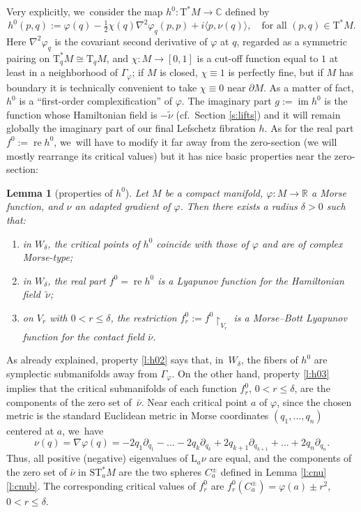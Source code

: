 \documentclass[10pt]{amsart}
\newcommand{\C}{{\mathbb C}}
\newcommand{\R}{{\mathbb R}}
\newcommand{\Crit}{\Gamma_{\!\varphi}}
\newcommand{\re}{\operatorname{re}}
\newcommand{\im}{\operatorname{im}}
\newcommand{\etc}{,\ldots,}
\newcommand{\tu}[1]{\textup{#1}}
\newcommand{\sT}{\mathrm{T}^\ast}
\newcommand{\sST}{\mathrm{ST}^\ast}
\newcommand{\rT}{\mathrm{T}}
\newcommand{\hnu}{\tilde\nu}
\newcommand{\cnu}{\bar\nu}
\def\Lnu_#1{{\mathrm L_#1\nu}}
\newcommand{\prg}[1]{\langle #1 \rangle}
\newcommand{\de}{\mathrel{:=}}
\newcommand{\rst}[1]{{\upharpoonright}_{\!#1}}
\let\del\partial
\let\on\colon
\theoremstyle{plain}
\newtheorem{lemma}[theorem]{Lemma}
\theoremstyle{definition}
\begin{document}
Very explicitly, we~consider the map $h^0 \on \sT M \to \C$ defined by
\[
h^0(p,q) \de \varphi(q) - \tfrac12 \chi(q) \nabla^2\varphi_q (p,p)
	+ i \prg{p, \nu(q)}, \quad \text{for all $(p,q) \in \sT M$.}
\]
Here $\nabla^2\varphi_q$ is the covariant second derivative of $\varphi$ at $q$,
regarded as a symmetric pairing on $\sT_qM \cong \rT_qM$, and $\chi \on M \to
[0,1]$ is a cut-off function equal to $1$ at least in a neighborhood of $\Crit$;
if $M$ is closed, $\chi \equiv 1$ is perfectly fine, but if $M$ has boundary it
is technically convenient to take $\chi \equiv 0$ near $\del M$. As a matter of
fact, $h^0$ is a ``first-order complexification'' of $\varphi$. The imaginary
part $g \de \im h^0$ is the function whose Hamiltonian field is $-\hnu$ (cf.\
Section \ref{s:lifts}) and it will remain globally the imaginary part of our
final Lefschetz fibration $h$. As for the real part $f^0 \de \re h^0$, we~will
have to modify it far away from the zero-section (we will mostly rearrange its
critical values) but it has nice basic properties near the zero-section:

\begin{lemma}[properties of $h^0$] \label{l:h0}
Let $M$ be a compact manifold, $\varphi \on M \to \R$ a Morse function, and
$\nu$ an adapted gradient of $\varphi$. Then there exists a radius $\delta>0$
such that\tu:
\begin{enumerate}
\item\label{l:h01}
in $W_\delta$, the critical points of $h^0$ coincide with those of $\varphi$ and
are of complex Morse-type\tu;
\item\label{l:h02}
in $W_\delta$, the real part $f^0 = \re h^0$ is a Lyapunov function for the
Hamiltonian field~$\hnu$\tu;
\item\label{l:h03}
on $V_r$ with $0 < r \le \delta$, the restriction $f_r^0 \de f^0 \rst{ V_r }$ is
a Morse--Bott Lyapunov function for the contact field $\cnu$.
\end{enumerate}
\end{lemma}

As already explained, property \eqref{l:h02} says that, in~$W_\delta$, the fibers of $h^0$
are symplectic submanifolds away from $\Crit$. On the other hand, property \eqref{l:h03}
implies that the critical submanifolds of each function $f_r^0$, $0 < r \le
\delta$, are the components of the zero set of~$\cnu$. Near each critical point
$a$ of $\varphi$, since the chosen metric is the standard Euclidean metric in
Morse coordinates $(q_1 \etc q_n)$ centered at $a$, we~have
\[
\nu(q) = \nabla\varphi(q) = - 2q_1 \del_{q_1} -\dots- 2q_k \del_{q_k}
	+ 2q_{k+1} \del_{q_{k+1}} +\dots+ 2q_n \del_{q_n}.
\]
Thus, all positive (\resp negative) eigenvalues of $\Lnu_a$ are equal, and the
components of the zero set of $\cnu$ in $\sST_aM$ are the two spheres $C_a^\pm$
defined in Lemma \ref{l:cnu}\eqref{l:cnub}. The corresponding critical values of $f_r^0$ are
$f_r^0(C_a^\pm) = \varphi(a) \pm r^2$, $0 < r \le \delta$.
\end{document}
